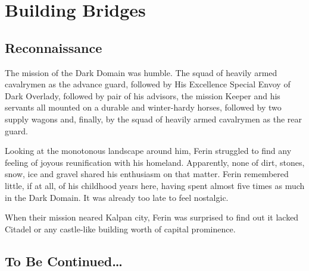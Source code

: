 \chapter{Building Bridges}

\section{Reconnaissance}

The mission of the Dark Domain was humble. The squad of heavily armed cavalrymen as the advance guard, followed by His Excellence Special Envoy of Dark Overlady, followed by pair of his advisors, the mission Keeper and his servants all mounted on a durable and winter-hardy horses, followed by two supply wagons and, finally, by the squad of heavily armed cavalrymen as the rear guard.

Looking at the monotonous landscape around him, Ferin struggled to find any feeling of joyous reunification with his homeland. Apparently, none of dirt, stones, snow, ice and gravel shared his enthusiasm on that matter. Ferin remembered little, if at all, of his childhood years here, having spent almost five times as much in the Dark Domain. It was already too late to feel nostalgic.

When their mission neared Kalpan city, Ferin was surprised to find out it lacked Citadel or any castle-like building worth of capital prominence.

\section{To Be Continued\dots}